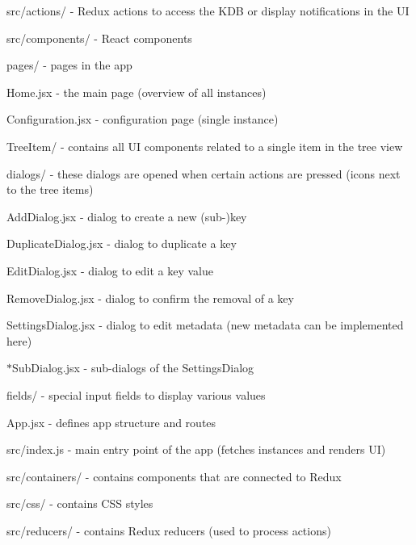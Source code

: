 \begin{DoxyItemize}
\item {\ttfamily src/actions/} -\/ Redux actions to access the K\+DB or display notifications in the UI
\item {\ttfamily src/components/} -\/ React components
\begin{DoxyItemize}
\item {\ttfamily pages/} -\/ pages in the app
\begin{DoxyItemize}
\item {\ttfamily Home.\+jsx} -\/ the main page (overview of all instances)
\item {\ttfamily Configuration.\+jsx} -\/ configuration page (single instance)
\end{DoxyItemize}
\item {\ttfamily Tree\+Item/} -\/ contains all UI components related to a single item in the tree view
\begin{DoxyItemize}
\item {\ttfamily dialogs/} -\/ these dialogs are opened when certain actions are pressed (icons next to the tree items)
\begin{DoxyItemize}
\item {\ttfamily Add\+Dialog.\+jsx} -\/ dialog to create a new (sub-\/)key
\item {\ttfamily Duplicate\+Dialog.\+jsx} -\/ dialog to duplicate a key
\item {\ttfamily Edit\+Dialog.\+jsx} -\/ dialog to edit a key value
\item {\ttfamily Remove\+Dialog.\+jsx} -\/ dialog to confirm the removal of a key
\item {\ttfamily Settings\+Dialog.\+jsx} -\/ dialog to edit metadata (new metadata can be implemented here)
\item {\ttfamily $\ast$\+Sub\+Dialog.jsx} -\/ sub-\/dialogs of the Settings\+Dialog
\end{DoxyItemize}
\item {\ttfamily fields/} -\/ special input fields to display various values
\end{DoxyItemize}
\item {\ttfamily App.\+jsx} -\/ defines app structure and routes
\end{DoxyItemize}
\item {\ttfamily src/index.\+js} -\/ main entry point of the app (fetches instances and renders UI)
\item {\ttfamily src/containers/} -\/ contains components that are connected to Redux
\item {\ttfamily src/css/} -\/ contains C\+SS styles
\item {\ttfamily src/reducers/} -\/ contains Redux reducers (used to process actions)
\end{DoxyItemize}

